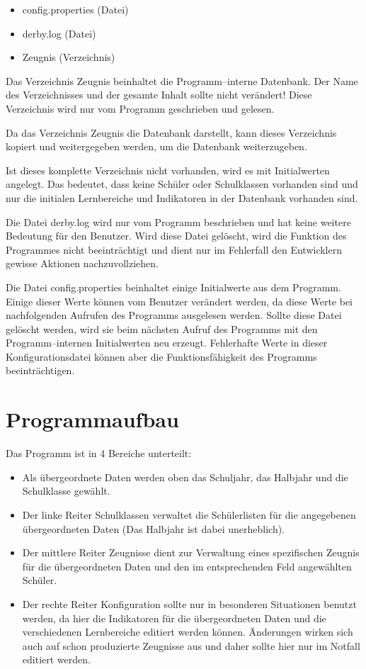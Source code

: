 \documentclass[a4paper,notitlepage,parskip]{scrartcl}
\newcommand\ott{\normalfont\ttfamily}
\begin{document}
\begin{itemize}
\item {\ott config.properties} (Datei)
\item {\ott derby.log} (Datei)
\item {\ott Zeugnis} (Verzeichnis)
\end{itemize}

Das Verzeichnis {\ott Zeugnis} beinhaltet die Programm--interne Datenbank.
Der Name des Verzeichnisses und der gesamte Inhalt sollte nicht verändert! Diese Verzeichnis wird nur vom Programm geschrieben und gelesen.

Da das Verzeichnis {\ott Zeugnis} die Datenbank darstellt, kann dieses Verzeichnis kopiert und weitergegeben werden, um die Datenbank weiterzugeben.

Ist dieses komplette Verzeichnis nicht vorhanden, wird es mit Initialwerten angelegt. Das bedeutet,
dass keine Schüler oder Schulklassen vorhanden sind und nur die initialen Lernbereiche und Indikatoren in der Datenbank vorhanden sind. 

Die Datei {\ott derby.log} wird nur vom Programm beschrieben und hat keine weitere Bedeutung für den Benutzer. Wird diese Datei gelöscht, wird die Funktion des Programmes nicht beeinträchtigt und dient nur im Fehlerfall den Entwicklern gewisse Aktionen nachzuvollziehen.

Die Datei {\ott config.properties} beinhaltet einige Initialwerte aus dem Programm.
Einige dieser Werte können vom Benutzer verändert werden, da diese Werte bei nachfolgenden Aufrufen des Programms ausgelesen werden. Sollte diese Datei gelöscht werden, wird sie beim nächsten Aufruf des Programms mit den Programm--internen Initialwerten neu erzeugt. Fehlerhafte Werte in dieser Konfigurationsdatei können aber die Funktionsfähigkeit des Programms beeinträchtigen.


\section{Programmaufbau}
Das Programm ist in 4 Bereiche unterteilt:

\begin{itemize}
\item Als  übergeordnete Daten werden oben das Schuljahr, das Halbjahr und die Schulklasse gewählt. 
\item Der linke Reiter {\ott Schulklassen} verwaltet die Schülerlisten für die angegebenen übergeordneten Daten (Das Halbjahr ist dabei unerheblich).
\item Der mittlere Reiter {\ott Zeugnisse} dient zur Verwaltung eines spezifischen Zeugnis für die übergeordneten Daten und den im entsprechenden Feld angewählten Schüler.
\item Der rechte Reiter {\ott Konfiguration} sollte nur in besonderen Situationen benutzt werden, da hier die Indikatoren für die übergeordneten Daten und die verschiedenen Lernbereiche editiert werden können. Änderungen wirken sich auch auf schon produzierte Zeugnisse aus und daher sollte hier nur im Notfall editiert werden.
\end{itemize}
\end{document}
